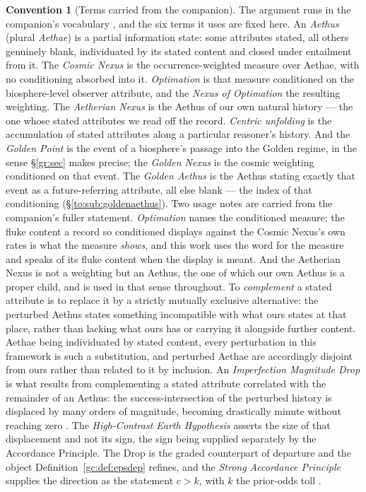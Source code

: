 \documentclass[11pt]{article}
\numberwithin{equation}{section}
\theoremstyle{plain}
\theoremstyle{definition}
\newtheorem{convention}[theorem]{Convention}
\theoremstyle{remark}
\begin{document}
\begin{convention}[Terms carried from the companion]\label{gc:conv:vocab}
The argument runs in the companion's vocabulary
\cite{Nexus, Ben26Found}, and the six terms it uses are fixed here.
An \emph{Aethus} (plural \emph{Aethae}) is a partial information state:
some attributes stated, all others genuinely blank, individuated by its
stated content and closed under entailment from it. The \emph{Cosmic
Nexus} is the occurrence-weighted measure over Aethae, with no
conditioning absorbed into it. \emph{Optimation} is that measure
conditioned on the biosphere-level observer attribute, and the
\emph{Nexus of Optimation} the resulting weighting. The
\emph{Aetherian Nexus} is the Aethus of our own natural history ---
the one whose stated attributes we read off the record. \emph{Centric
unfolding} is the accumulation of stated attributes along a
particular reasoner's history. And the \emph{Golden Point} is the event
of a biosphere's passage into the Golden regime, in the sense
\S\ref{gr:sec} makes precise; the \emph{Golden Nexus} is the cosmic
weighting conditioned on that event. The \emph{Golden Aethus} is the
Aethus stating exactly that event as a future-referring attribute, all
else blank --- the index of that conditioning
(\S\ref{to:sub:goldenaethus}).
Two usage notes are carried from the companion's fuller statement.
\emph{Optimation} names the conditioned measure; the fluke content a
record so conditioned displays against the Cosmic Nexus's own rates is
what the measure \emph{shows}, and this work uses the word for the
measure and speaks of its fluke content when the display is meant. And
the Aetherian Nexus is not a weighting but an Aethus, the one of
which our own Aethus is a proper child, and is used in that sense
throughout.
To \emph{complement} a stated attribute is to replace it by a
strictly mutually exclusive alternative: the perturbed Aethus states
something incompatible with what ours states at that place, rather than
lacking what ours has or carrying it alongside further content. Aethae
being individuated by stated content, every perturbation in this
framework is such a substitution, and perturbed Aethae are accordingly
disjoint from ours rather than related to it by inclusion. An
\emph{Imperfection Magnitude Drop} is what results from complementing a
stated attribute correlated with the remainder of an Aethus: the
success-intersection of the perturbed history is displaced by many
orders of magnitude, becoming drastically minute without reaching zero
\cite[\S IMD]{Nexus}. The \emph{High-Contrast Earth Hypothesis} asserts
the size of that displacement and not its sign, the sign being supplied
separately by the Accordance Principle. The Drop is the graded
counterpart of departure and the object Definition~\ref{gc:def:epsdep}
refines, and the \emph{Strong Accordance Principle} supplies the
direction as the statement $c>k$, with $k$ the prior-odds toll
\cite{Ben26Optimal}.
\end{convention}
\end{document}
